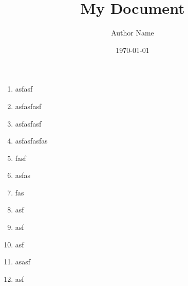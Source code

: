 \documentclass{article}
\title{My Document}\author{Author Name}\date{\today}
\begin{document}
\begin{enumerate}
\item 
asfasf
\item 
asfasfasf
\item 
asfasfasf
\item 
asfasfasfas
\item 
fasf
\item 
asfas
\item 
fas
\item 
asf
\item 
asf
\item 
asf
\item 
asasf
\item 
asf

\end{enumerate}
\end{document}
